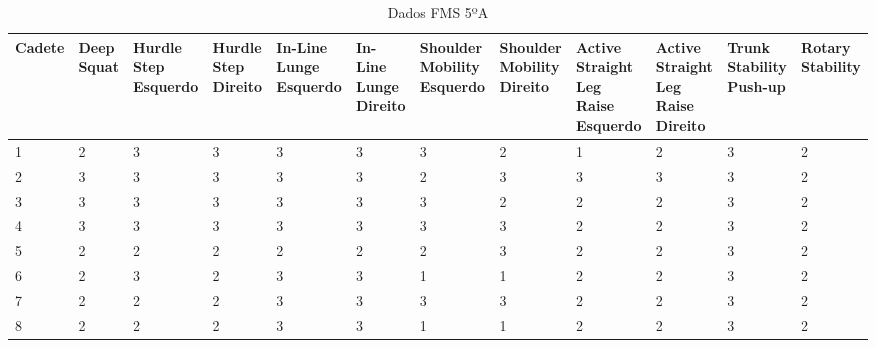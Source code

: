 \begin{landscape}
    
    \begin{table}[h]
        \centering
        \caption{Dados FMS 5ºA}
        \renewcommand{\arraystretch}{1.3}  %
        \begin{adjustbox}{scale=0.9}
        \begin{tabular}{|p{1.8cm}|p{1.6cm}|p{1.6cm}|p{1.6cm}|p{1.6cm}|p{1.6cm}|p{1.6cm}|p{1.6cm}|p{1.6cm}|p{1.6cm}|p{1.6cm}|p{1.6cm}|}
            \hline
            \textbf{Cadete} & \textbf{Deep Squat} & \textbf{Hurdle Step Esquerdo} & \textbf{Hurdle Step Direito} & \textbf{In-Line Lunge Esquerdo} & \textbf{In-Line Lunge Direito} & \textbf{Shoulder Mobility Esquerdo} & \textbf{Shoulder Mobility Direito} & \textbf{Active Straight Leg Raise Esquerdo} & \textbf{Active Straight Leg Raise Direito} & \textbf{Trunk Stability Push-up} & \textbf{Rotary Stability} \\
            \hline
            1 & 2 & 3 & 3 & 3 & 3 & 3 & 2 & 1 & 2 & 3 & 2 \\
            2 & 3 & 3 & 3 & 3 & 3 & 2 & 3 & 3 & 3 & 3 & 2 \\
            3 & 3 & 3 & 3 & 3 & 3 & 3 & 2 & 2 & 2 & 3 & 2 \\
            4 & 3 & 3 & 3 & 3 & 3 & 3 & 3 & 2 & 2 & 3 & 2 \\
            5 & 2 & 2 & 2 & 2 & 2 & 2 & 3 & 2 & 2 & 3 & 2 \\
            6 & 2 & 3 & 2 & 3 & 3 & 1 & 1 & 2 & 2 & 3 & 2 \\
            7 & 2 & 2 & 2 & 3 & 3 & 3 & 3 & 2 & 2 & 3 & 2 \\
            8 & 2 & 2 & 2 & 3 & 3 & 1 & 1 & 2 & 2 & 3 & 2 \\
            \hline
        \end{tabular}
        \end{adjustbox}
    \end{table}
    

\end{landscape}
